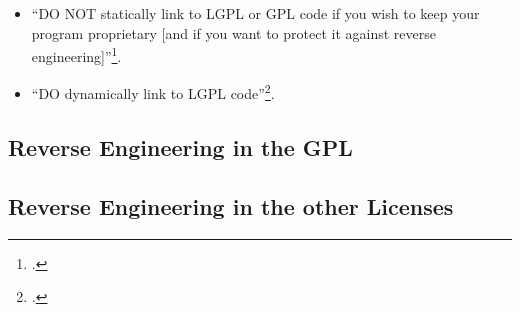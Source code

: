 \begin{itemize}
  \item \enquote{DO NOT statically link to LGPL or GPL code if you wish to keep
  your program proprietary [and if you want to protect it against reverse
  engineering]}\footcite[cf.][6]{Ilardi2010a}.
  \item \enquote{DO dynamically link to LGPL
  code}\footcite[cf.][6]{Ilardi2010a}.
\end{itemize}



\subsection{Reverse Engineering in the GPL}

\subsection{Reverse Engineering in the other Licenses}













%
